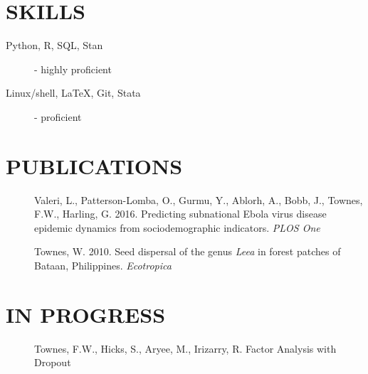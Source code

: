 \documentclass[line, margin]{res}
\begin{document}
\begin{resume}
\section{SKILLS}
\begin{description}
\item[Python, R, SQL, Stan] - highly proficient
\item[Linux/shell, \LaTeX, Git, Stata] - proficient
\end{description}

\section{PUBLICATIONS}

\begin{description}
\item[] Valeri, L., Patterson-Lomba, O., Gurmu, Y., Ablorh, A., Bobb, J., Townes, F.W., Harling, G. 2016. Predicting subnational Ebola virus disease epidemic dynamics from sociodemographic indicators. \textit{PLOS One}
\end{description}

\begin{description}
\item[] Townes, W. 2010. Seed dispersal of the genus \textit{Leea} in forest patches of Bataan, Philippines. \textit{Ecotropica}
\end{description}


\section{IN PROGRESS}
\begin{description}
\item[] Townes, F.W., Hicks, S., Aryee, M., Irizarry, R. Factor Analysis with Dropout
\end{description}


\end{resume}
\end{document}
